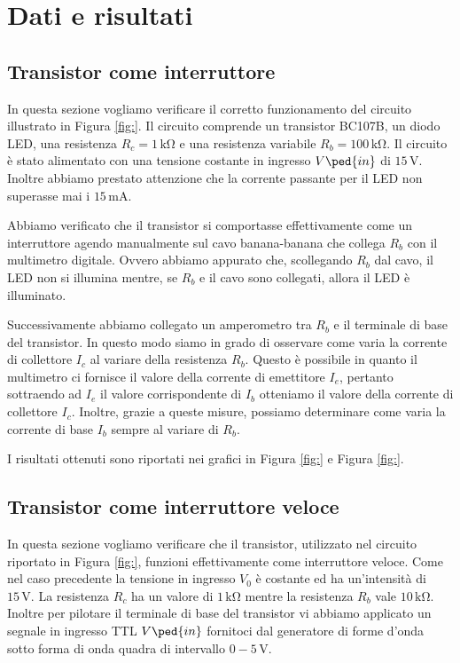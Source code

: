 \section*{Dati e risultati}

\subsection{Transistor come interruttore}

In questa sezione vogliamo verificare il corretto funzionamento del circuito illustrato in Figura \ref{fig:}.
Il circuito comprende un transistor BC107B, un diodo LED, una resistenza $R_c=1\,\si{\kilo\ohm}$ e una resistenza variabile $R_b=100\,\si{\kilo\ohm}$. Il circuito è stato alimentato con una tensione costante in ingresso $V\ped{in}$ di $15\,\si{\volt}$. Inoltre abbiamo prestato attenzione che la corrente passante per il LED non superasse mai i $15\,\si{\milli\ampere}$.

Abbiamo verificato che il transistor si comportasse effettivamente come un interruttore agendo manualmente sul cavo banana-banana che collega $R_b$ con il multimetro digitale. Ovvero abbiamo appurato che, scollegando $R_b$ dal cavo, il LED non si illumina mentre, se $R_b$ e il cavo sono collegati, allora il LED è illuminato.

Successivamente abbiamo collegato un amperometro tra $R_b$ e il terminale di base del transistor. In questo modo siamo in grado di osservare come varia la corrente di collettore $I_c$ al variare della resistenza $R_b$. Questo è possibile in quanto il multimetro ci fornisce il valore della corrente di emettitore $I_e$, pertanto sottraendo ad $I_e$ il valore corrispondente di $I_b$ otteniamo il valore della corrente di collettore $I_c$. Inoltre, grazie a queste misure, possiamo determinare come varia la corrente di base $I_b$ sempre al variare di $R_b$.

I risultati ottenuti sono riportati nei grafici in Figura \ref{fig:} e Figura \ref{fig:}.

\subsection{Transistor come interruttore veloce}

In questa sezione vogliamo verificare che il transistor, utilizzato nel circuito riportato in Figura \ref{fig:}, funzioni effettivamente come interruttore veloce.
Come nel caso precedente la tensione in ingresso $V_0$ è costante ed ha un'intensità di $15\,\si{\volt}$. La resistenza $R_c$ ha un valore di $1\,\si{\kilo\ohm}$ mentre la resistenza $R_b$ vale $10\,\si{\kilo\ohm}$. Inoltre per pilotare il terminale di base del transistor vi abbiamo applicato un segnale in ingresso TTL $V\ped{in}$ fornitoci dal generatore di forme d'onda sotto forma di onda quadra di intervallo $0-5\,\si{\volt}$.

